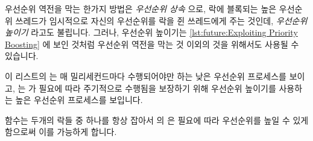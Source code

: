 우선순위 역전을 막는 한가지 방법은 \emph{우선순위 상속} 으로, 락에 블록되는
높은 우선순위 쓰레드가 임시적으로 자신의 우선순위를 락을 쥔 쓰레드에게 주는
것인데, \emph{우선순위 높이기} 라고도 불립니다.
그러나, 우선순위 높이기는
\cref{lst:future:Exploiting Priority Boosting} 에 보인 것처럼 우선순위 역전을
막는 것 이외의 것을 위해서도 사용될 수 있습니다.
\begin{fcvref}
이 리스트의
 는 매 밀리세컨드마다 수행되어야만 하는 낮은 우선순위
프로세스를 보이고,  는  가 필요에
따라 주기적으로 수행됨을 보장하기 위해 우선순위 높이기를 사용하는 높은 우선순위
프로세스를 보입니다.

 함수는 두개의  락들 중 하나를 항상 잡아서
 의  은 필요에 따라 우선순위를 높일 수 있게
함으로써 이를 가능하게 합니다.
\end{fcvref}

\iffalse

One way to avoid priority inversion is \emph{priority inheritance},
in which a high-priority thread blocked on a lock temporarily donates
its priority to the lock's holder, which is also called \emph{priority
boosting}.
However, priority boosting can be used for things other than avoiding
priority inversion, as shown in
\cref{lst:future:Exploiting Priority Boosting}.
\begin{fcvref}[ln:future:Exploiting Priority Boosting]
\Clnrefrange{low:b}{low:e} of this listing show a low-priority process that must
nevertheless run every millisecond or so, while \clnrefrange{high:b}{high:e} of
this same listing show a high-priority process that uses priority
boosting to ensure that \co{boostee()} runs periodically as needed.

The \co{boostee()} function arranges this by always holding one of
the two \co{boost_lock[]} locks, so that \clnrefrange{acq}{rel} of
\co{booster()} can boost priority as needed.
\end{fcvref}

\fi

